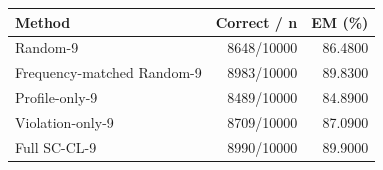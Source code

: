\begin{tabular}{lrr}
\toprule
Method & Correct / n & EM (\%) \\
\midrule
Random-9 & 8648/10000 & 86.4800 \\
Frequency-matched Random-9 & 8983/10000 & 89.8300 \\
Profile-only-9 & 8489/10000 & 84.8900 \\
Violation-only-9 & 8709/10000 & 87.0900 \\
Full SC-CL-9 & 8990/10000 & 89.9000 \\
\bottomrule
\end{tabular}
